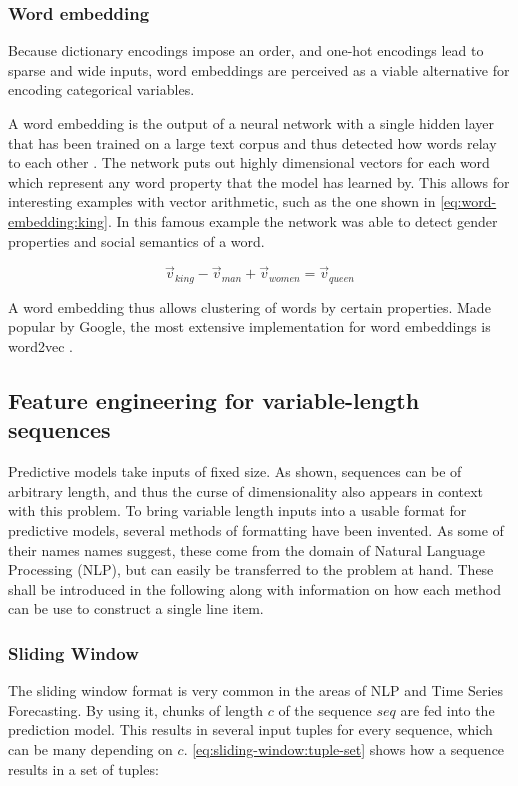 \subsubsection*{Word embedding}
Because dictionary encodings impose an order, and one-hot encodings lead to sparse and wide inputs, word embeddings are perceived as a viable alternative for encoding categorical variables.

A word embedding is the output of a neural network with a single hidden layer that has been trained on a large text corpus and thus detected how words relay to each other \cite{web:word-embedding}. The network puts out highly dimensional vectors for each word which represent any word property that the model has learned by. This allows for interesting examples with vector arithmetic, such as the one shown in \autoref{eq:word-embedding:king}. In this famous example the network was able to detect gender properties and social semantics of a word. 

\begin{equation}
    \label{eq:word-embedding:king}
    \vec{v}_{king} - \vec{v}_{man} + \vec{v}_{women} = \vec{v}_{queen}
\end{equation}

A word embedding thus allows clustering of words by certain properties.
Made popular by Google, the most extensive implementation for word embeddings is word2vec \cite{web:ahogrammer, goldberg2014word2vec}.

\subsection{Feature engineering for variable-length sequences}
Predictive models take inputs of fixed size. As shown, sequences can be of arbitrary length, and thus the curse of dimensionality also appears in context with this problem. To bring variable length inputs into a usable format for predictive models, several methods of formatting have been invented. As some of their names names suggest, these come from the domain of Natural Language Processing (NLP), but can easily be transferred to the problem at hand. These shall be introduced in the following along with information on how each method can be use to construct a single line item.

\subsubsection*{Sliding Window}
The sliding window format is very common in the areas of NLP and Time Series Forecasting. By using it, chunks of length $c$ of the sequence $seq$ are fed into the prediction model. This results in several input tuples for every sequence, which can be many depending on $c$. \autoref{eq:sliding-window:tuple-set} shows how a sequence results in a set of tuples:

